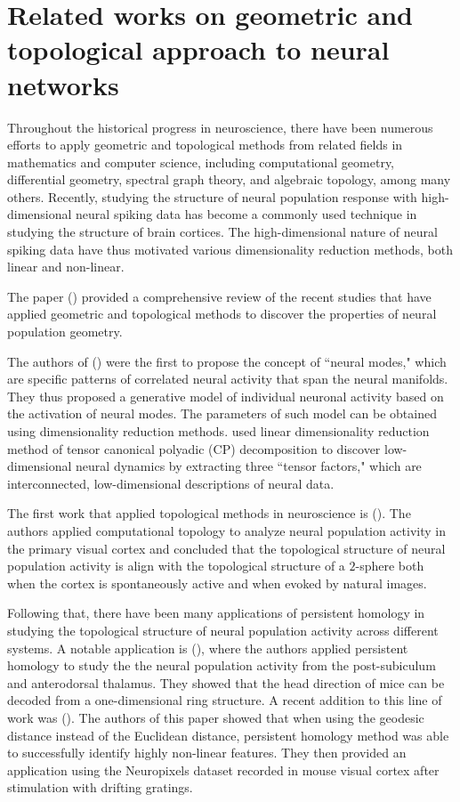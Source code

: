 \section{Related works on geometric and topological approach to neural networks}
Throughout the historical progress in neuroscience, there have been numerous efforts to apply geometric and topological methods from related fields in mathematics and computer science, including computational geometry, differential geometry, spectral graph theory, and algebraic topology, among many others. Recently, studying the structure of neural population response with high-dimensional neural spiking data has become a commonly used technique in studying the structure of brain cortices. The high-dimensional nature of neural spiking data have thus motivated various dimensionality reduction methods, both linear and non-linear. 

The paper (\cite{chung_neural_2021}) provided a comprehensive review of the recent studies that have applied geometric and topological methods to discover the properties of neural population geometry. 

The authors of (\cite{gallego_neural_2017}) were the first to propose the concept of ``neural modes," which are specific patterns of correlated neural activity that span the neural manifolds. They thus proposed a generative model of individual neuronal activity based on the activation of neural modes. The parameters of such model can be obtained using dimensionality reduction methods. \cite{williams_unsupervised_2018} used linear dimensionality reduction method of tensor canonical polyadic (CP) decomposition to discover low-dimensional neural dynamics by extracting three ``tensor factors," which are interconnected, low-dimensional descriptions of neural data.

The first work that applied topological methods in neuroscience is (\cite{singh_top_v1_2008}). The authors applied computational topology to analyze neural population activity in the primary visual cortex and concluded that the topological structure of neural population activity is align with the topological structure of a $2$-sphere both when the cortex is spontaneously active and when evoked by natural images.

Following that, there have been many applications of persistent homology in studying the topological structure of neural population activity across different systems. A notable application is (\cite{chaudhuri_intrinsic_2019}), where the authors applied persistent homology to study the the neural population activity from the post-subiculum and anterodorsal thalamus. They showed that the head direction of mice can be decoded from a one-dimensional ring structure. A recent addition to this line of work was (\cite{beshkov_geodesic-based_2021}). The authors of this paper showed that when using the geodesic distance instead of the Euclidean distance, persistent homology method was able to successfully identify highly non-linear features. They then provided an application using the Neuropixels dataset recorded in mouse visual cortex after stimulation with drifting gratings.

